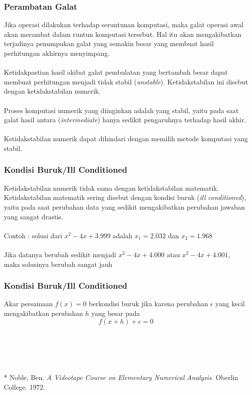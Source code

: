\documentclass{beamer}
\begin{document}

\begin{frame}
\frametitle{Perambatan Galat}
Jika operasi dilakukan terhadap seruntunan komputasi, maka galat operasi awal akan merambat dalam runtun komputasi tersebut. Hal itu akan mengakibatkan terjadinya penumpukan galat yang semakin besar yang membuat hasil perhitungan akhirnya menyimpang.
\\\ \\Ketidakpastian hasil akibat galat pembulatan yang bertambah besar dapat membuat perhitungan menjadi tidak stabil (\textit{unstable}). Ketidakstabilan ini disebut dengan ketidakstabilan numerik.
\\\ \\Proses komputasi numerik yang diinginkan adalah yang stabil, yaitu pada saat galat hasil antara (\textit{intermediate}) hanya sedikit pengaruhnya terhadap hasil akhir.
\\\ \\Ketidakstabilan numerik dapat dihindari dengan memilih metode komputasi yang stabil.
\end{frame}


\begin{frame}
\frametitle{Kondisi Buruk/Ill Conditioned}
Ketidakstabilan numerik tidak sama dengan ketidakstabilan matematik. Ketidakstabilan matematik sering disebut dengan kondisi buruk (\textit{ill conditioned}), yaitu pada saat perubahan data yang sedikit mengakibatkan perubahan jawaban yang sangat drastis.
\\\ \\Contoh : solusi dari $x^2-4x+3.999$ adalah $x_1 = 2.032$ dan $x_2 = 1.968$
\\\ \\Jika datanya berubah sedikit menjadi $x^2 - 4x + 4.000$ atau $x^2 - 4x+4.001$, maka solusinya berubah sangat jauh
\end{frame}


\begin{frame}
\frametitle{Kondisi Buruk/Ill Conditioned}
Akar persamaan $f(x) = 0$ berkondisi buruk jika karena perubahan $\epsilon$ yang kecil mengakibatkan perubahan $h$ yang besar pada
\begin{equation}
f(x+h) +\epsilon = 0
\nonumber
\end{equation} 
\\\ \\\ \\\ \\\ \\ * Noble, Ben. \textit{A Videotape Course on Elementary Numerical Analysis}. Oberlin College. 1972.
\end{frame}
\end{document}
